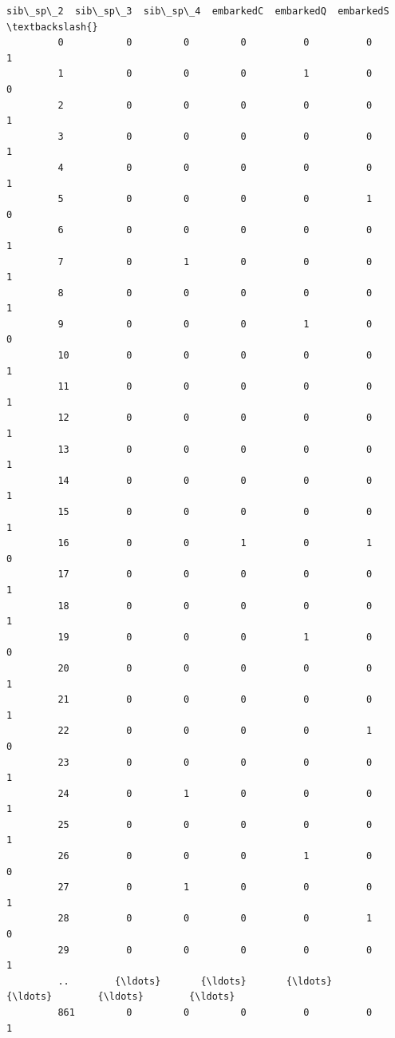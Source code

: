 \documentclass[11pt]{article}
\begin{document}
\begin{Verbatim}[commandchars=\\\{\}]
              sib\_sp\_2  sib\_sp\_3  sib\_sp\_4  embarkedC  embarkedQ  embarkedS  \textbackslash{}
         0           0         0         0          0          0          1   
         1           0         0         0          1          0          0   
         2           0         0         0          0          0          1   
         3           0         0         0          0          0          1   
         4           0         0         0          0          0          1   
         5           0         0         0          0          1          0   
         6           0         0         0          0          0          1   
         7           0         1         0          0          0          1   
         8           0         0         0          0          0          1   
         9           0         0         0          1          0          0   
         10          0         0         0          0          0          1   
         11          0         0         0          0          0          1   
         12          0         0         0          0          0          1   
         13          0         0         0          0          0          1   
         14          0         0         0          0          0          1   
         15          0         0         0          0          0          1   
         16          0         0         1          0          1          0   
         17          0         0         0          0          0          1   
         18          0         0         0          0          0          1   
         19          0         0         0          1          0          0   
         20          0         0         0          0          0          1   
         21          0         0         0          0          0          1   
         22          0         0         0          0          1          0   
         23          0         0         0          0          0          1   
         24          0         1         0          0          0          1   
         25          0         0         0          0          0          1   
         26          0         0         0          1          0          0   
         27          0         1         0          0          0          1   
         28          0         0         0          0          1          0   
         29          0         0         0          0          0          1   
         ..        {\ldots}       {\ldots}       {\ldots}        {\ldots}        {\ldots}        {\ldots}   
         861         0         0         0          0          0          1   

\end{Verbatim}
\end{document}
